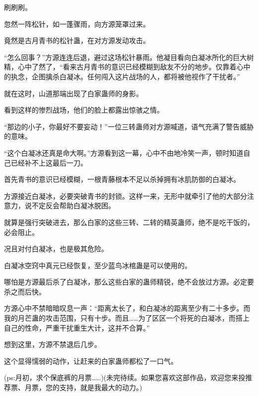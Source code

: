 \begin{this_body}
刷刷刷。

忽然一阵松针，如一蓬骤雨，向方源笼罩过来。

竟然是古月青书的松针蛊，在对方源发动攻击。

“怎么回事？”方源连连后退，避过这场松针暴雨。他凝目看向白凝冰所化的巨大树精，心中了然了，“看来古月青书的意识已经模糊到敌友不分的地步。仅靠着心中的执念，企图擒杀白凝冰。任何闯入这片战场的人，都将被他视作了干扰者。”

就在这时，山道那端出现了白家蛊师的身影。

看到这样的惨烈战场，他们的脸上都露出惊骇之情。

“那边的小子，你最好不要妄动！”一位三转蛊师对方源喊道，语气充满了警告威胁的意味。

“这个白凝冰还真是命大啊。”方源看到这一幕，心中不由地冷笑一声，顿时知道自己已经补不上这最后一刀。

首先青书的意识已经模糊，一根青藤根本不足以杀掉拥有冰肌防御的白凝冰。

方源接近白凝冰，必要突破青书的封锁。这样一来，无形中就牵引了他的大部分注意力，说不定反会帮助白凝冰脱困。

就算是强行突破进去，那么白家的这些三转、二转的精英蛊师，绝不是吃干饭的，必会阻止。

况且对付白凝冰，也是极其危险。

白凝冰空窍中真元已经恢复，至少蓝鸟冰棺蛊是可以使用的。

哪怕是方源最后杀了白凝冰，那么这些白家的蛊师精锐，绝不会放过方源。必定要杀之而后快。

方源心中不禁暗暗叹息一声：“距离太长了，和白凝冰的距离至少有二十多步。而我的月芒蛊的攻击范围，只有十步。而且……为了区区一个将死的白凝冰，而搭上自己的性命，严重干扰重生大计，这并不合算。”

想到这里，方源不禁退后几步。

这个显得懦弱的动作，让赶来的白家蛊师都松了一口气。

(ps:月初，求个保底裤的月票……)(未完待续。如果您喜欢这部作品，欢迎您来投推荐票、月票，您的支持，就是我最大的动力。)

\end{this_body}

